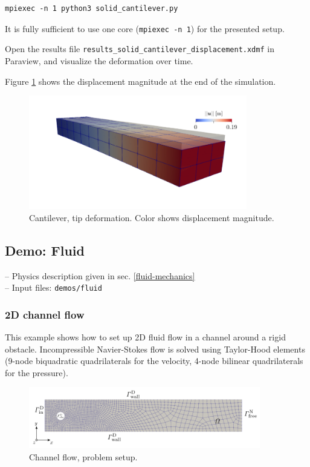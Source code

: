 \documentclass[a4paper,12pt]{report}
\begin{document}
\begin{verbatim}
mpiexec -n 1 python3 solid_cantilever.py
\end{verbatim}

It is fully sufficient to use one core (\verb"mpiexec -n 1") for the presented setup.

Open the results file \verb"results_solid_cantilever_displacement.xdmf" in Paraview, and visualize the deformation over time.

Figure \ref{fig:cantilever_results} shows the displacement magnitude at the end of the simulation.

\begin{figure}
\centering
\includegraphics[width=0.85\textwidth]{fig/cantilever_results.png}
\caption{Cantilever, tip deformation. Color shows displacement magnitude.}
\label{fig:cantilever_results}
\end{figure}


\subsection{Demo: Fluid}\label{demo-fluid}

-- Physics description given in sec. \ref{fluid-mechanics}\\

-- Input files: \verb"demos/fluid"

\subsubsection*{2D channel flow}

This example shows how to set up 2D fluid flow in a channel around a rigid obstacle. Incompressible Navier-Stokes flow is solved using Taylor-Hood elements
(9-node biquadratic quadrilaterals for the velocity, 4-node bilinear quadrilaterals for the pressure).

\begin{figure}
\centering
\includegraphics[width=0.9\textwidth]{fig/channel_setup.png}
\caption{Channel flow, problem setup.}
\label{fig:channel_setup}
\end{figure}
\end{document}
